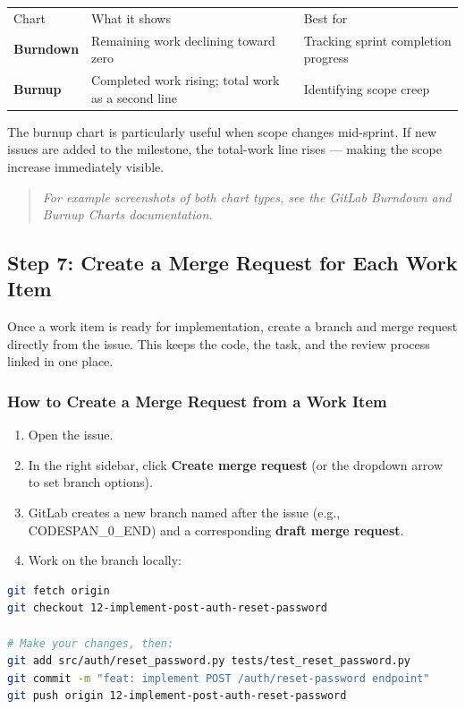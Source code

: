 \documentclass[11pt,a4paper]{book}
\begin{document}
\begin{tabular}{lll}
\hline
Chart & What it shows & Best for \\
\textbf{Burndown} & Remaining work declining toward zero & Tracking sprint completion progress \\
\textbf{Burnup} & Completed work rising; total work as a second line & Identifying scope creep \\
\hline
\end{tabular}

The burnup chart is particularly useful when scope changes mid-sprint. If new issues are added to the milestone, the total-work line rises --- making the scope increase immediately visible.

\begin{quote}
\textit{For example screenshots of both chart types, see the GitLab Burndown and Burnup Charts documentation.}
\end{quote}

\medskip

\subsection{Step 7: Create a Merge Request for Each Work Item}

Once a work item is ready for implementation, create a branch and merge request directly from the issue. This keeps the code, the task, and the review process linked in one place.

\subsubsection{How to Create a Merge Request from a Work Item}

\begin{enumerate}
  \item Open the issue.
  \item In the right sidebar, click \textbf{Create merge request} (or the dropdown arrow to set branch options).
  \item GitLab creates a new branch named after the issue (e.g., CODESPAN\_0\_END) and a corresponding \textbf{draft merge request}.
  \item Work on the branch locally:
\end{enumerate}

\begin{lstlisting}[language=Bash]
git fetch origin
git checkout 12-implement-post-auth-reset-password

# Make your changes, then:
git add src/auth/reset_password.py tests/test_reset_password.py
git commit -m "feat: implement POST /auth/reset-password endpoint"
git push origin 12-implement-post-auth-reset-password
\end{lstlisting}
\end{document}
